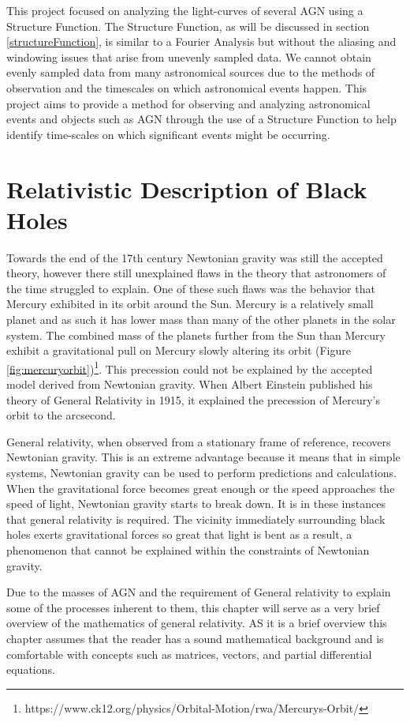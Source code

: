 \documentclass[12pt, oneside]{smuthesis}
\begin{document}
This project focused on analyzing the light-curves of several AGN using a Structure Function. The Structure Function, as will be discussed in section \ref{structureFunction}, is similar to a Fourier Analysis but without the aliasing and windowing issues that arise from unevenly sampled data. We cannot obtain evenly sampled data from many astronomical sources due to the methods of observation and the timescales on which astronomical events happen. This project aims to provide a method for observing and analyzing astronomical events and objects such as AGN through the use of a Structure Function to help identify time-scales on which significant events might be occurring.

\chapter{\sc Relativistic Description of Black Holes} \label{generalRelativity}

Towards the end of the 17th century Newtonian gravity was still the accepted theory, however there still unexplained flaws in the theory that astronomers of the time struggled to explain. One of these such flaws was the behavior that Mercury exhibited in its orbit around the Sun. Mercury is a relatively small planet and as such it has lower mass than many of the other planets in the solar system. The combined mass of the planets further from the Sun than Mercury exhibit a gravitational pull on Mercury slowly altering its orbit (Figure \ref{fig:mercuryorbit})\footnote{https://www.ck12.org/physics/Orbital-Motion/rwa/Mercurys-Orbit/}. This precession could not be explained by the accepted model derived from Newtonian gravity. When Albert Einstein published his theory of General Relativity in 1915, it explained the precession of Mercury's orbit to the arcsecond.

General relativity, when observed from a stationary frame of reference, recovers Newtonian gravity. This is an extreme advantage because it means that in simple systems, Newtonian gravity can be used to perform predictions and calculations. When the gravitational force becomes great enough or the speed approaches the speed of light, Newtonian gravity starts to break down. It is in these instances that general relativity is required. The vicinity immediately surrounding black holes exerts gravitational forces so great that light is bent as a result, a phenomenon that cannot be explained within the constraints of Newtonian gravity.

Due to the masses of AGN and the requirement of General relativity to explain some of the processes inherent to them, this chapter will serve as a very brief overview of the mathematics of general relativity. AS it is a brief overview this chapter assumes that the reader has a sound mathematical background and is comfortable with concepts such as matrices, vectors, and partial differential equations.
\end{document}
